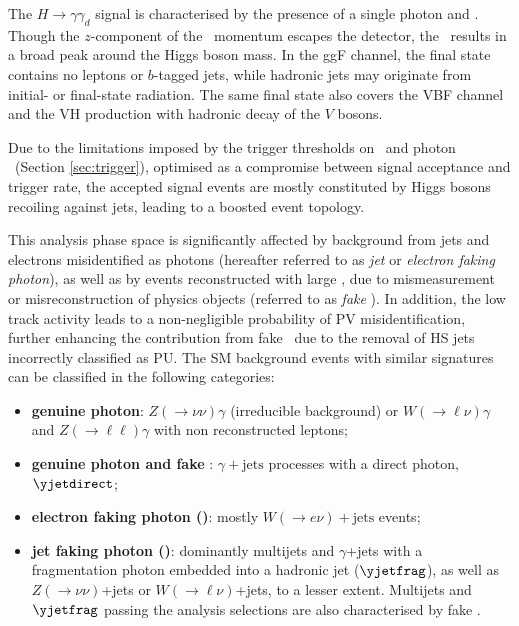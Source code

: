 The $H\to\gamma\gamma_d$ signal is characterised by the presence of a single photon and \ETmiss. Though the $z$-component of the \gammad\, momentum escapes the detector, the \mT\ results in a broad peak around the Higgs boson mass. In the ggF channel, the final state contains no leptons or $b$-tagged jets, while hadronic jets may originate from initial- or final-state radiation.
The same final state also covers the VBF channel and the VH production with hadronic decay of the $V$ bosons. %

Due to the limitations imposed by the trigger thresholds on \ETmiss\ and photon \pTy\ (Section \ref{sec:trigger}), optimised as a compromise between signal acceptance and trigger rate, the accepted signal events are mostly constituted by Higgs bosons recoiling against jets, leading to a boosted event topology. 

This analysis phase space is significantly affected by background from jets and electrons misidentified as photons (hereafter referred to as \textit{jet} or \textit{electron faking photon}), as well as by events reconstructed with large \ETmiss, due to mismeasurement or misreconstruction of physics objects (referred to as \textit{fake \ETmiss}).
In addition, the low track activity leads to a non-negligible probability of PV misidentification, further enhancing the contribution from fake 
\ETmiss\ due to the removal of HS jets incorrectly classified as PU.
The SM background events with similar signatures can be classified in the following categories:
\begin{itemize}

\item \textbf {genuine photon}: $Z(\to\nu\nu)\gamma$ (irreducible background) or $W(\to\ell\nu)\gamma$ and $Z(\to\ell\ell)\gamma$ with non reconstructed leptons;
\item \textbf {genuine photon and fake \pTmiss}: %
$\gamma+\mathrm{jets}$ processes with a direct photon, $\yjetdirect$;
\item \textbf {electron faking photon (\efakey)}: mostly $W(\to e\nu)+\mathrm{jets}$ events;
\item \textbf {jet faking photon (\jfakey)}: dominantly multijets and %
$\gamma$+jets with a fragmentation photon embedded into a hadronic jet ($\yjetfrag$), as well as $Z(\to\nu\nu)$+jets or $W(\to\ell\nu)$+jets, to a lesser extent. Multijets and $\yjetfrag$ passing the analysis selections are also characterised by fake \ETmiss. 
\end{itemize}